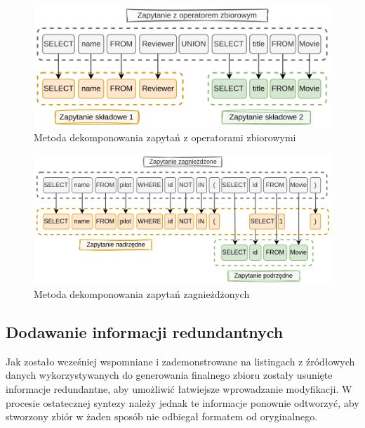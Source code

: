 
\begin{figure}[ht!]
  \centering
  \includegraphics[width=1.0\linewidth]{images/query_decomposition_serial.png}
  \caption{Metoda dekomponowania zapytań z operatorami zbiorowymi}
  \label{fig:query-decomposition-serial}
\end{figure}

\begin{figure}[ht!]
  \centering
  \includegraphics[width=1.0\linewidth]{images/query_decomposition_nested.png}
  \caption{Metoda dekomponowania zapytań zagnieżdżonych}
  \label{fig:query-decomposition-nested}
\end{figure}

\subsection{Dodawanie informacji redundantnych}
Jak zostało wcześniej wspomniane i zademonstrowane na listingach z źródłowych danych wykorzystywanych do generowania finalnego zbioru zostały usunięte informacje redundantne, aby umożliwić łatwiejsze wprowadzanie modyfikacji. W procesie ostatecznej syntezy należy jednak te informacje ponownie odtworzyć, aby stworzony zbiór w żaden sposób nie odbiegał formatem od oryginalnego.

